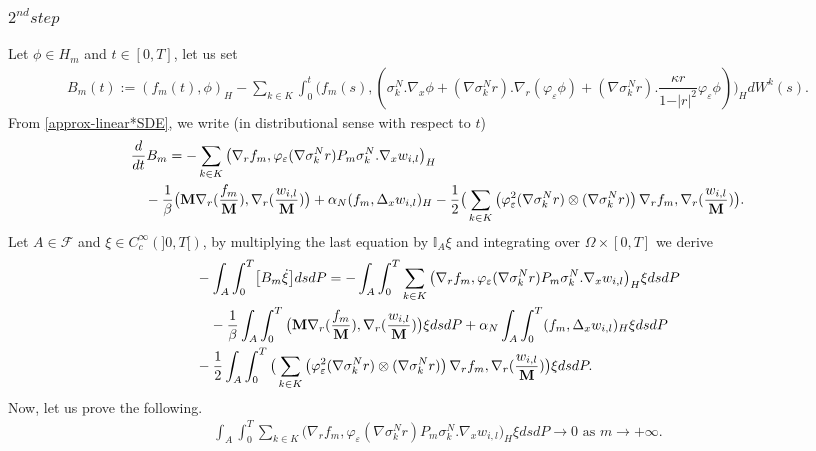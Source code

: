 \documentclass[a4paper,12pt, reqno]{amsart}
\begin{document}
	\subsubsection*{$2^{nd} step$}
    	Let $\phi\in H_m$ and  $t\in [0,T]$, let us  set 
	\begin{align*}
		B_m(t) :=(f_m(t), \phi )_H  -\sum_{k\in K}\int_0^t\big(f_m(s),( \sigma_k^N.\nabla_x\phi +(\nabla \sigma_k^Nr).\nabla_r (\varphi_\varepsilon\phi)+(\nabla \sigma_k^Nr).\dfrac{\kappa r}{1-\vert r\vert^2}\varphi_\varepsilon\phi)\big)_HdW^k(s).
	\end{align*}
	From    \eqref{approx-linear*SDE},   we  write   (in distributional sense    with    respect to  $t$)
	\begin{align*}&\dfrac{d}{dt}B_m=-\sum_{k\in K}\big(\nabla_rf_m, \varphi_\varepsilon(\nabla \sigma_k^Nr)P_m\sigma_k^N.\nabla_x w_{i,l}\big)_H\\&\quad-\dfrac{1}{\beta}\big(\mathbf{M}\nabla_r(\dfrac{f_m}{\mathbf{M}}),\nabla_r(\dfrac{w_{i,l}}{\mathbf{M}})\big)+\alpha_N( f_m,\Delta_x w_{i,l})_H - \dfrac{1}{2}\big(\sum_{k\in K}\left(\varphi_\varepsilon^2(\nabla \sigma_k^Nr) \otimes (\nabla \sigma_k^Nr)\right) \nabla_rf_m,\nabla_r(\dfrac{w_{i,l}}{\mathbf{M}})\big).\notag\end{align*}
	Let $A\in \mathcal{F}$ and $\xi\in  C^\infty_c(]0,T[)$, by multiplying the    last    equation    by    $\mathbb{I}_A\xi$ and integrating  over $\Omega \times [0,T]$ we derive 
    	\begin{align}&-\int_A\int_0^T\bigl[B_m\dot\xi \bigr]dsdP=-\int_A\int_0^T\sum_{k\in K}\big(\nabla_rf_m, \varphi_\varepsilon(\nabla \sigma_k^Nr)P_m\sigma_k^N.\nabla_x w_{i,l}\big)_H \xi dsdP\notag\\&\quad-\dfrac{1}{\beta}\int_A\int_0^T\big(\mathbf{M}\nabla_r(\dfrac{f_m}{\mathbf{M}}),\nabla_r(\dfrac{w_{i,l}}{\mathbf{M}})\big) \xi dsdP+\alpha_N\int_A\int_0^T( f_m,\Delta_x w_{i,l})_H\xi dsdP\notag\\& - \dfrac{1}{2}\int_A\int_0^T\big(\sum_{k\in K}\left(\varphi_\varepsilon^2(\nabla \sigma_k^Nr) \otimes (\nabla \sigma_k^Nr)\right) \nabla_rf_m,\nabla_r(\dfrac{w_{i,l}}{\mathbf{M}})\big)\xi dsdP.\label{eq-to-pass-base-elem}\end{align}
	Now,    let us  prove the following.
	\begin{align}\label{limit-covarnaince-0}\int_A\int_0^T\sum_{k\in K}\big(\nabla_rf_m, \varphi_\varepsilon(\nabla \sigma_k^Nr)P_m\sigma_k^N.\nabla_x w_{i,l}\big)_H \xi dsdP\to0 \text{    as  }   m\to    +\infty.
	\end{align}
\end{document}
